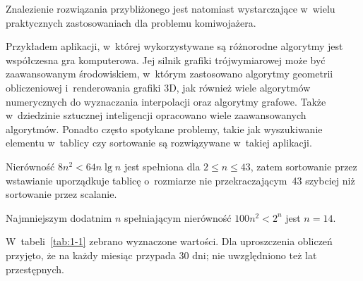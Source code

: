 Znalezienie rozwiązania przybliżonego jest natomiast wystarczające w~wielu praktycznych zastosowaniach dla problemu komiwojażera.


\exercise{} %
Przykładem aplikacji, w~której wykorzystywane są różnorodne algorytmy jest współczesna gra komputerowa. Jej silnik grafiki trójwymiarowej może być zaawansowanym środowiskiem, w~którym zastosowano algorytmy geometrii obliczeniowej i~renderowania grafiki 3D, jak również wiele algorytmów numerycznych do wyznaczania interpolacji oraz algorytmy grafowe. Także w~dziedzinie sztucznej inteligencji opracowano wiele zaawansowanych algorytmów. Ponadto często spotykane problemy, takie jak wyszukiwanie elementu w~tablicy czy sortowanie są rozwiązywane w~takiej aplikacji.

\exercise{} %
Nierówność $8n^2<64n\lg n$ jest spełniona dla $2\le n\le43$, zatem sortowanie przez wstawianie uporządkuje tablicę o~rozmiarze nie przekraczającym~43 szybciej niż sortowanie przez scalanie.

\exercise{} %
Najmniejszym dodatnim $n$ spełniającym nierówność $100n^2<2^n$ jest $n=14$.

\problems

W~tabeli~\ref{tab:1-1} zebrano wyznaczone wartości. Dla uproszczenia obliczeń przyjęto, że na każdy miesiąc przypada 30 dni; nie uwzględniono też lat przestępnych.

